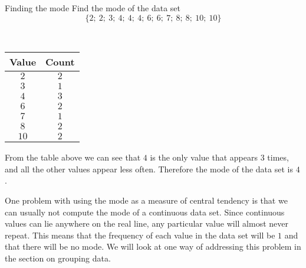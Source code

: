 \begin{wex}{Finding the mode}{
    Find the mode of the data set
    \begin{equation*}
      \{2;\ 2;\ 3;\ 4;\ 4;\ 4;\ 6;\ 6;\ 7;\ 8;\ 8;\ 10;\ 10\}
    \end{equation*}
}{
\\
  \begin{center}
    \begin{tabular}{|c|c|} \hline
      \textbf{Value} & \textbf{Count} \\ \hline

      $2$ & $2$ \\ \hline
      $3$ & $1$ \\\hline 
      $4$ & $3$ \\\hline
      $6$ & $2$ \\\hline
      $7$ & $1$ \\\hline
      $8$ & $2$ \\\hline
      $10$ & $2$ \\\hline

    \end{tabular}
  \end{center}


  From the table above we can see that $4$ is the only value that
  appears $3$ times, and all the other values appear less
  often. Therefore the mode of the data set is $4$.

}
\end{wex}

One problem with using the mode as a measure of central tendency is
that we can usually not compute the mode of a continuous data
set. Since continuous values can lie anywhere on the real line, any
particular value will almost never repeat. This means that the
frequency of each value in the data set will be $1$ and that there will
be no mode. We will look at one way of addressing this problem in
the section
on grouping data.

